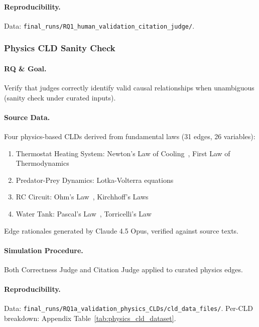\paragraph{Reproducibility.}
Data: \texttt{final\_runs/RQ1\_human\_validation\_citation\_judge/}.

\subsubsection{Physics CLD Sanity Check}
\label{sec:physics_validation}

\paragraph{RQ \& Goal.}
Verify that judges correctly identify valid causal relationships when unambiguous (sanity check under curated inputs).

\paragraph{Source Data.}
Four physics-based CLDs derived from fundamental laws (31 edges, 26 variables):
\begin{enumerate}[noitemsep]
    \item Thermostat Heating System: Newton's Law of Cooling~\cite{newton1701scala}, First Law of Thermodynamics~\cite{clausius1850heat}
    \item Predator-Prey Dynamics: Lotka-Volterra equations~\cite{lotka1925elements,volterra1928fluctuations}
    \item RC Circuit: Ohm's Law~\cite{ohm1827galvanische}, Kirchhoff's Laws~\cite{kirchhoff1845durchgang}
    \item Water Tank: Pascal's Law~\cite{pascal1663equilibre}, Torricelli's Law~\cite{torricelli1644opera}
\end{enumerate}
Edge rationales generated by Claude 4.5 Opus, verified against source texts.

\paragraph{Simulation Procedure.}
Both Correctness Judge and Citation Judge applied to curated physics edges.

\paragraph{Reproducibility.}
Data: \texttt{final\_runs/RQ1a\_validation\_physics\_CLDs/cld\_data\_files/}. Per-CLD breakdown: Appendix Table~\ref{tab:physics_cld_dataset}.

